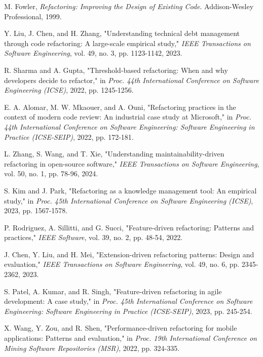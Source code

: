 \documentclass[journal,onecolumn]{IEEEtran}
\begin{document}
\begin{thebibliography}{00}
 M. Fowler, \textit{Refactoring: Improving the Design of Existing Code}. Addison-Wesley Professional, 1999.

 Y. Liu, J. Chen, and H. Zhang, "Understanding technical debt management through code refactoring: A large-scale empirical study," \textit{IEEE Transactions on Software Engineering}, vol. 49, no. 3, pp. 1123-1142, 2023.

 R. Sharma and A. Gupta, "Threshold-based refactoring: When and why developers decide to refactor," in \textit{Proc. 44th International Conference on Software Engineering (ICSE)}, 2022, pp. 1245-1256.

 E. A. Alomar, M. W. Mkaouer, and A. Ouni, "Refactoring practices in the context of modern code review: An industrial case study at Microsoft," in \textit{Proc. 44th International Conference on Software Engineering: Software Engineering in Practice (ICSE-SEIP)}, 2022, pp. 172-181.

 L. Zhang, S. Wang, and T. Xie, "Understanding maintainability-driven refactoring in open-source software," \textit{IEEE Transactions on Software Engineering}, vol. 50, no. 1, pp. 78-96, 2024.

 S. Kim and J. Park, "Refactoring as a knowledge management tool: An empirical study," in \textit{Proc. 45th International Conference on Software Engineering (ICSE)}, 2023, pp. 1567-1578.

 P. Rodriguez, A. Sillitti, and G. Succi, "Feature-driven refactoring: Patterns and practices," \textit{IEEE Software}, vol. 39, no. 2, pp. 48-54, 2022.

 J. Chen, Y. Liu, and H. Mei, "Extension-driven refactoring patterns: Design and evaluation," \textit{IEEE Transactions on Software Engineering}, vol. 49, no. 6, pp. 2345-2362, 2023.

 S. Patel, A. Kumar, and R. Singh, "Feature-driven refactoring in agile development: A case study," in \textit{Proc. 45th International Conference on Software Engineering: Software Engineering in Practice (ICSE-SEIP)}, 2023, pp. 245-254.

 X. Wang, Y. Zou, and R. Shen, "Performance-driven refactoring for mobile applications: Patterns and evaluation," in \textit{Proc. 19th International Conference on Mining Software Repositories (MSR)}, 2022, pp. 324-335.


\end{thebibliography}
\end{document}
